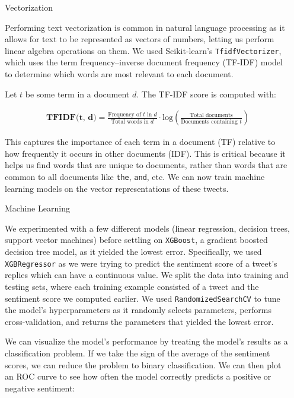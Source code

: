 \documentclass[final]{beamer}
\def\code#1{\texttt{#1}}
\newlength{\sepwidth}
\newlength{\colwidth}
\newcommand{\separatorcolumn}{\begin{column}{\sepwidth}\end{column}}
\begin{document}
\begin{frame}[t]
\begin{columns}[t]
\separatorcolumn

\begin{column}{\colwidth}

  \begin{block}{Vectorization}

    Performing text vectorization is common in natural language processing as it allows for text to be represented as vectors of numbers, letting us perform linear algebra operations on them. We used Scikit-learn's \code{TfidfVectorizer}, which uses the term frequency–inverse document frequency (TF-IDF) model to determine which words are most relevant to each document.
    
    Let $t$ be some term in a document $d$. The TF-IDF score is computed with:

    \begin{align*}
      \textbf{TFIDF(t, d)} = \frac{\text{Frequency of } t \text{ in } d}{\text{Total words in } d}
                       \cdot \text{log}\left(\frac{\text{Total documents}}{\text{Documents containing } t}\right)
    \end{align*}

    This captures the importance of each term in a document (TF) relative to how frequently it occurs in other documents (IDF). This is critical because it helps us find words that are unique to documents, rather than words that are common to all documents like \code{the}, \code{and}, etc. We can now train machine learning models on the vector representations of these tweets.

  \end{block}

  \begin{block}{Machine Learning}

    We experimented with a few different models (linear regression, decision trees, support vector machines) before settling on \code{XGBoost}, a gradient boosted decision tree model, as it yielded the lowest error. Specifically, we used \code{XGBRegressor} as we were trying to predict the sentiment score of a tweet's replies which can have a continuous value. We split the data into training and testing sets, where each training example consisted of a tweet and the sentiment score we computed earlier. We used \code{RandomizedSearchCV} to tune the model's hyperparameters as it randomly selects parameters, performs cross-validation, and returns the parameters that yielded the lowest error.

    We can visualize the model's performance by treating the model's results as a classification problem. If we take the sign of the average of the sentiment scores, we can reduce the problem to binary classification. We can then plot an ROC curve to see how often the model correctly predicts a positive or negative sentiment:


\end{block}
\end{column}
\end{columns}
\end{frame}
\end{document}
